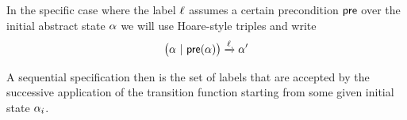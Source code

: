 In the specific case where the label $\ell$ assumes a certain
precondition $\mathsf{pre}$ over the initial abstract state $\alpha$ we
will use Hoare-style triples and write
\[ \big(\abstate\ |\ \apre(\abstate)\big) \xrightarrow{\alabel}  \abstate' \]

A sequential specification then is the set of labels that are accepted
by the successive application of the transition function starting from
some given initial state $\alpha_{i}$.





